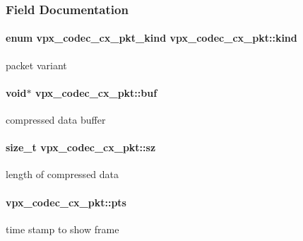 \subsubsection{Field Documentation}
\hypertarget{structvpx__codec__cx__pkt_a41f395b39516343c1329a4a85a0084f2}{
\paragraph[{kind}]{\setlength{\rightskip}{0pt plus 5cm}enum {\bf vpx\-\_\-codec\-\_\-cx\-\_\-pkt\-\_\-kind} vpx\-\_\-codec\-\_\-cx\-\_\-pkt\-::kind}}\label{structvpx__codec__cx__pkt_a41f395b39516343c1329a4a85a0084f2}
packet variant \hypertarget{structvpx__codec__cx__pkt_a9e1db068593b6037e70b05b5239784d2}{
\paragraph[{buf}]{\setlength{\rightskip}{0pt plus 5cm}void$\ast$ vpx\-\_\-codec\-\_\-cx\-\_\-pkt\-::buf}}\label{structvpx__codec__cx__pkt_a9e1db068593b6037e70b05b5239784d2}
compressed data buffer \hypertarget{structvpx__codec__cx__pkt_a857321ba2dc65e81c430d14c36a542d9}{
\paragraph[{sz}]{\setlength{\rightskip}{0pt plus 5cm}size\-\_\-t vpx\-\_\-codec\-\_\-cx\-\_\-pkt\-::sz}}\label{structvpx__codec__cx__pkt_a857321ba2dc65e81c430d14c36a542d9}
length of compressed data \hypertarget{structvpx__codec__cx__pkt_aa75fe039fe6b47fb25d20684864bef12}{
\paragraph[{pts}]{ vpx\-\_\-codec\-\_\-cx\-\_\-pkt\-::pts}}\label{structvpx__codec__cx__pkt_aa75fe039fe6b47fb25d20684864bef12}
\begin{DoxyVerb}          time stamp to show frame
\end{DoxyVerb}
